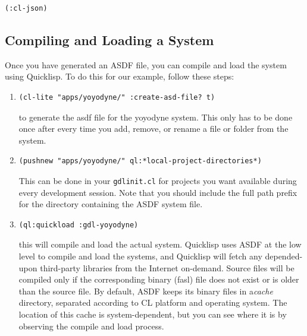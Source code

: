 \documentclass [11pt]{book}
\begin{document}
\begin{verbatim}(:cl-json)
\end{verbatim}



\subsection{Compiling and Loading a System}

\label{subsec:compilingandloadingasystem}

Once you have generated an ASDF file, you can compile and
load the system using Quicklisp. To do this for our example, follow these steps:

\begin{enumerate}

\item 

\begin{verbatim}(cl-lite "apps/yoyodyne/" :create-asd-file? t)
\end{verbatim} to generate the asdf file for the yoyodyne system. This only has to be done once after every time you add, remove, or rename a file or folder from the system.

\item 

\begin{verbatim}(pushnew "apps/yoyodyne/" ql:*local-project-directories*)
\end{verbatim} This can be done in your \texttt{gdlinit.cl} for projects you want available during every development session. Note that you should include
the full path prefix for the directory containing the ASDF system file.

\item 

\begin{verbatim}(ql:quickload :gdl-yoyodyne)
\end{verbatim} this will compile and load the actual system. Quicklisp uses ASDF at the low level to compile and 
load the systems, and Quicklisp will fetch any depended-upon third-party libraries from the Internet on-demand. 
Source files will be compiled only if the corresponding binary (fasl) file does not exist or is older than the
source file. By default, ASDF keeps its binary files in a\emph{cache} directory, separated according to CL platform and operating system. The location of this cache
is system-dependent, but you can see where it is by observing the compile and load process.

\end{enumerate}
\end{document}
